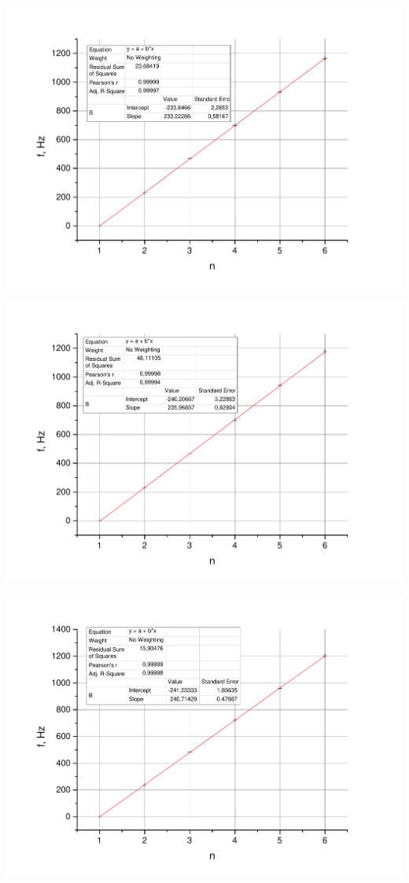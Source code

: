 \documentclass[a4paper,12pt]{article}
\begin{document}
		\includegraphics[width = 0.9\linewidth]{Graph2gr}
		
		\includegraphics[width = 0.9\linewidth]{Graph3gr}
		
		\includegraphics[width = 0.9\linewidth]{Graph4gr}
		
\end{document}
